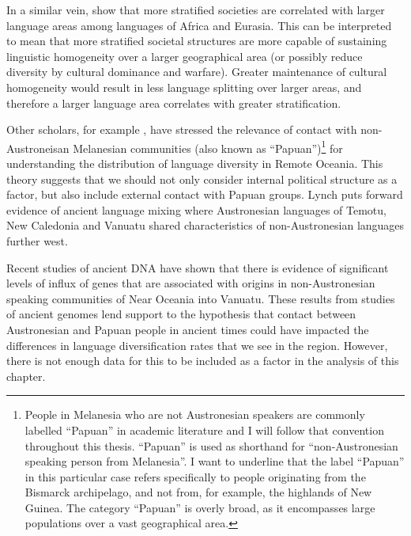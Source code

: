 \documentclass[a4paper,10pt]{article} %
\begin{document}
In a similar vein, \citet{curriemace2009} show that more stratified societies are correlated with larger language areas among languages of Africa and Eurasia. This can be interpreted to mean that more stratified societal structures are more capable of sustaining linguistic homogeneity over a larger geographical area (or possibly reduce diversity by cultural dominance and warfare). Greater maintenance of cultural homogeneity would result in less language splitting over larger areas, and therefore a larger language area correlates with greater stratification. 

Other scholars, for example \citet[104]{lynch1981melanesian}, have stressed the relevance of contact with non-Austroneisan Melanesian communities (also known as ``Papuan'')\footnote{People in Melanesia who are not Austronesian speakers are commonly labelled ``Papuan'' in academic literature and I will follow that convention throughout this thesis. ``Papuan'' is used as shorthand for ``non-Austronesian speaking person from Melanesia''. I want to underline that the label ``Papuan'' in this particular case refers specifically to people originating from the Bismarck archipelago, and not from, for example, the highlands of New Guinea. The category ``Papuan'' is overly broad, as it encompasses large populations over a vast geographical area.} for understanding the distribution of language diversity in Remote Oceania. This theory suggests that we should not only consider internal political structure as a factor, but also include external contact with Papuan groups. Lynch puts forward evidence of ancient language mixing where Austronesian languages of Temotu, New Caledonia and Vanuatu shared characteristics of non-Austronesian languages further west. 

Recent studies of ancient DNA \citep{lipson_harvad_ancient_dna_vanuatu_2018, posth_jena_ancient_dna_vanuatu_2018} have shown that there is evidence of significant levels of influx of genes that are associated with origins in non-Austronesian speaking communities of Near Oceania into Vanuatu. These results from studies of ancient genomes lend support to the hypothesis that contact between Austronesian and Papuan people in ancient times could have impacted the differences in language diversification rates that we see in the region. However, there is not enough data for this to be included as a factor in the analysis of this chapter.


\end{document}
